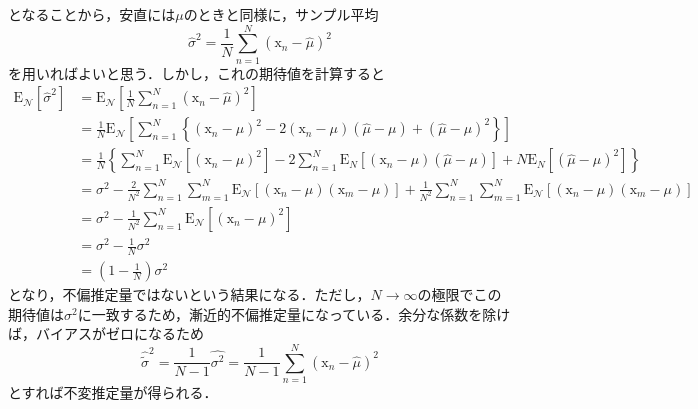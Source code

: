 \documentclass[a4paper,11pt]{jsreport}
\begin{document}
となることから，安直には$\mu$のときと同様に，サンプル平均
\begin{equation}
  \hat{\sigma}^2
  = \frac{1}{N} \sum_{n=1}^N (\mathrm{x}_n - \hat{\mu})^2
\end{equation}
を用いればよいと思う．しかし，これの期待値を計算すると
\begin{align*}
  \mathrm{E}_\mathcal{N}\left[\hat{\sigma}^2\right]
   & =\mathrm{E}_\mathcal{N}\left[\frac{1}{N} \sum_{n=1}^N\left(\mathrm{x}_n-\hat{\mu}\right)^2\right]                                                                                                                                       \\
   & =\frac{1}{N} \mathrm{E}_\mathcal{N}\left[\sum_{n=1}^N\left\{\left(\mathrm{x}_n-\mu\right)^2-2\left(\mathrm{x}_n-\mu\right)(\hat{\mu}-\mu)+(\hat{\mu}-\mu)^2\right\}\right]                                                                       \\
   & =\frac{1}{N}\left\{\sum_{n=1}^N \mathrm{E}_\mathcal{N}\left[\left(\mathrm{x}_n-\mu\right)^2\right]-2 \sum_{n=1}^N \mathrm{E}_N\left[\left(\mathrm{x}_n-\mu\right)(\hat{\mu}-\mu)\right]+N \mathrm{E}_N\left[(\hat{\mu}-\mu)^2\right]\right\}                       \\
   & =\sigma^2-\frac{2}{N^2} \sum_{n=1}^N \sum_{m=1}^N \mathrm{E}_\mathcal{N}\left[\left(\mathrm{x}_n-\mu\right)\left(\mathrm{x}_m-\mu\right)\right]+\frac{1}{N^2} \sum_{n=1}^N \sum_{m=1}^N \mathrm{E}_\mathcal{N}\left[\left(\mathrm{x}_n-\mu\right)\left(\mathrm{x}_m-\mu\right)\right] \\
   & =\sigma^2-\frac{1}{N^2} \sum_{n=1}^N \mathrm{E}_\mathcal{N}\left[\left(\mathrm{x}_n-\mu\right)^2\right]                                                                                                                                 \\
   & =\sigma^2-\frac{1}{N} \sigma^2                                                                                                                                                                              \\
   & =\left(1-\frac{1}{N}\right) \sigma^2
\end{align*}
となり，不偏推定量ではないという結果になる．ただし，$N \rightarrow \infty$の極限でこの期待値は$\sigma^2$に一致するため，漸近的不偏推定量になっている．余分な係数を除けば，バイアスがゼロになるため
\begin{equation}
  \hat{\tilde{\sigma}}^2 
  = \frac{1}{N - 1} \hat{\sigma^2} = \frac{1}{N - 1} \sum_{n=1}^N (\mathrm{x}_n - \hat{\mu})^2
\end{equation}
とすれば不変推定量が得られる．
\end{document}
